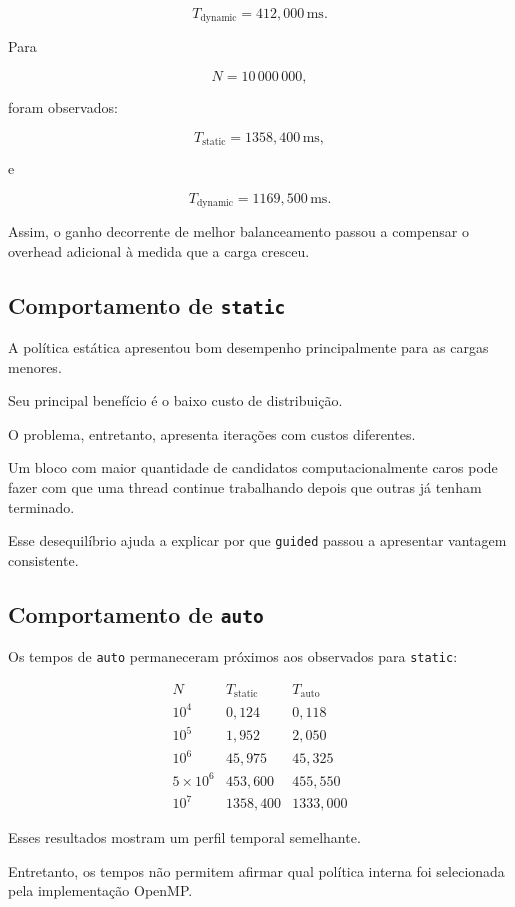 \[
T_{\mathrm{dynamic}}
=
412,000\,\mathrm{ms}.
\]

Para

\[
N=10\,000\,000,
\]

foram observados:

\[
T_{\mathrm{static}}
=
1358,400\,\mathrm{ms},
\]

e

\[
T_{\mathrm{dynamic}}
=
1169,500\,\mathrm{ms}.
\]

Assim, o ganho decorrente de melhor balanceamento passou a compensar o
overhead adicional à medida que a carga cresceu.


\subsection{Comportamento de \texttt{static}}

A política estática apresentou bom desempenho principalmente para as cargas
menores.

Seu principal benefício é o baixo custo de distribuição.

O problema, entretanto, apresenta iterações com custos diferentes.

Um bloco com maior quantidade de candidatos computacionalmente caros pode
fazer com que uma thread continue trabalhando depois que outras já tenham
terminado.

Esse desequilíbrio ajuda a explicar por que \texttt{guided} passou a
apresentar vantagem consistente.


\subsection{Comportamento de \texttt{auto}}

Os tempos de \texttt{auto} permaneceram próximos aos observados para
\texttt{static}:

\[
\begin{array}{c|cc}
N & T_{\mathrm{static}} & T_{\mathrm{auto}}\\
\hline
10^4 & 0,124 & 0,118\\
10^5 & 1,952 & 2,050\\
10^6 & 45,975 & 45,325\\
5\times10^6 & 453,600 & 455,550\\
10^7 & 1358,400 & 1333,000
\end{array}
\]

Esses resultados mostram um perfil temporal semelhante.

Entretanto, os tempos não permitem afirmar qual política interna foi
selecionada pela implementação OpenMP.

